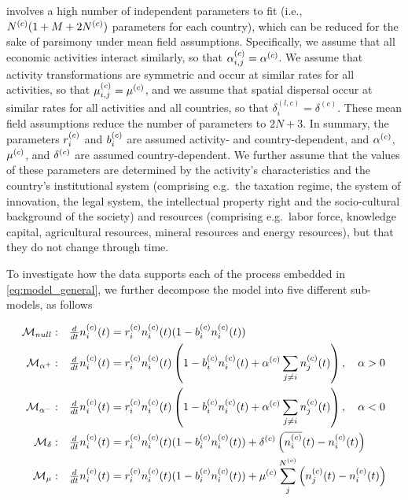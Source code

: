  involves a high number of independent parameters to fit (i.e., $N^{(c)}(1 + M + 2N^{(c)})$ parameters for each country), which can be reduced for the sake of parsimony under mean field assumptions. Specifically, we assume that all economic activities interact similarly, so that $\alpha_{i,j}^{(c)}  = \alpha^{(c)} $. We assume that activity transformations are symmetric and occur at similar rates for all activities, so that $\mu_{i,j}^{(c)}  = \mu^{(c)} $, and we assume that spatial dispersal occur at similar rates for all activities and all countries, so that $\delta^{(l,c)} _{i} = \delta^{(c)}$. These mean field assumptions reduce the number of parameters to $2N+3$. 
% 
In summary, the parameters $r_i^{(c)}$ and $b_i^{(c)}$ are assumed activity- and country-dependent, and $\alpha^{(c)}$, $\mu^{(c)}$, and $\delta^{(c)}$ are assumed country-dependent. We further assume that the values of these parameters are determined by the activity's characteristics and the country's institutional system (comprising e.g.~the taxation regime, the system of innovation, the legal system, the intellectual property right and the socio-cultural background of the society) and resources (comprising e.g.~labor force, knowledge capital, agricultural resources, mineral resources and energy resources), but that they do not change through time.

To investigate how the data supports each of the process embedded in \cref{eq:model_general}, we further decompose the model into five different sub-models, as follows

  \begin{align}
  \label{eq:submodels1}
    \mathcal{M}_{null}&:  &&\tfrac{d}{dt} n_i^{(c)}(t)  = r_i^{(c)}  n_i^{(c)}(t) (1 -  b_i^{(c)} n_i^{(c)} (t) ) \\
  \label{eq:submodels2}
    \mathcal{M}_{\alpha^+}&: && \tfrac{d}{dt} n_i^{(c)}(t)  = r_i^{(c)}  n_i^{(c)}(t) \left(1 -  b_i^{(c)} n_i^{(c)}(t) + \alpha^{(c)}  \sum_{j \neq i} n_j^{(c)}(t) \right), \quad \alpha > 0\\
      \label{eq:submodels3}
    \mathcal{M}_{\alpha^-}&: && \tfrac{d}{dt} n_i^{(c)}(t)  = r_i^{(c)}  n_i^{(c)}(t) \left(1 -  b_i^{(c)}  n_i^{(c)}(t) + \alpha^{(c)}  \sum_{j \neq i} n_j^{(c)}(t) \right), \quad \alpha < 0\\
      \label{eq:submodels4}
    \mathcal{M}_\delta&: && \tfrac{d}{dt} n_i^{(c)}(t)  = r_i^{(c)}  n_i^{(c)}(t) (1 - b_i^{(c)}  n_i^{(c)}(t) ) + \delta^{(c)} \left(\overline{n_i^{(c)}}(t) - n_i^{(c)}(t) \right) \\
      \label{eq:submodels5}
    \mathcal{M}_{\mu}&: && \tfrac{d}{dt} n_i^{(c)}(t)  = r_i^{(c)}  n_i^{(c)}(t) (1 -  b_i^{(c)} n_i^{(c)}(t) ) + \mu^{(c)} \sum_j^{N^{(c)}} \left( n_j^{(c)}  (t) - n_i^{(c)}(t)  \right)
  \end{align}

